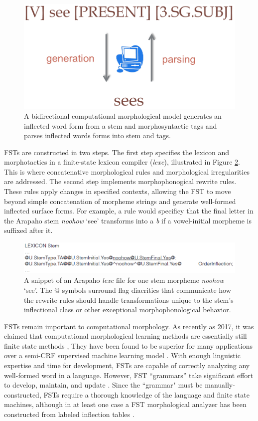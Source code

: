\documentclass[12pt]{article}
\begin{document}
\begin{figure}[ht]
\label{fig:bidir}
\begin{center}
\includegraphics[width=0.5\columnwidth]{bidirectional.PNG}
\caption{A bidirectional computational morphological model generates an inflected word form from a stem and morphosyntactic tags and parses inflected words forms into stem and tags.}
\end{center}
\end{figure}

FSTs are constructed in two steps. The first step specifies the lexicon and morphotactics in a finite-state lexicon compiler ({\it lexc}), illustrated in Figure \ref{fig:lexc}. This is where concatenative morphological rules and morphological irregularities are addressed. The second step implements morphophonogical rewrite rules. These rules apply changes in specified contexts, allowing the FST to move beyond simple concatenation of morpheme strings and generate well-formed inflected surface forms. For example, a rule would specificy that the final letter in the Arapaho stem \textit{noohow} `see' transforms into a \textit{b} if a vowel-initial morpheme is suffixed after it.
\bigskip
\begin{figure}[ht]
\label{fig:lexc}
\begin{center}
\includegraphics[width=0.95\columnwidth]{FSTlexicon.PNG}
\caption{A snippet of an Arapaho \textit{lexc} file for one stem morpheme \textit{noohow} `see'. The @ symbols surround flag diacritics that communicate how the rewrite rules should handle transformations unique to the stem's inflectional class or other exceptional morphophonological behavior.}
\end{center}
\end{figure}

FSTs remain important to computational morphology. As recently as 2017, it was claimed that computational morphological learning methods are essentially still finite state methods \cite{goldsmith_computational_2017}, They have been found to be superior for many applications over a semi-CRF supervised machine learning model \cite{cotterell_labeled_2015}. With enough linguistic expertise and time for development, FSTs are capable of correctly analyzing any well-formed word in a language. However, FST “grammars” take significant effort to develop, maintain, and update \cite{durrett_supervised_2013,moeller_neural_2018}. Since the ``grammar" must be manually-constructed, FSTs require a thorough knowledge of the language and finite state machines, although in at least one case a FST morphological analyzer has been constructed from labeled inflection tables \cite{forsberg_learning_2016}. 
\end{document}
